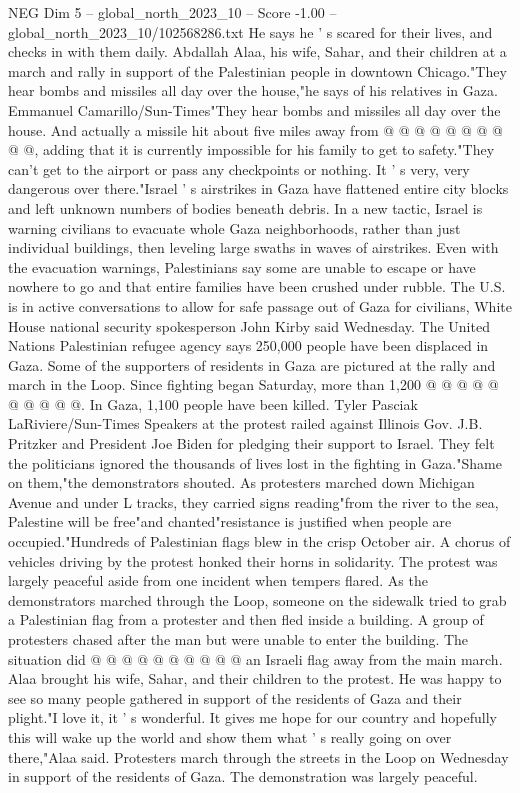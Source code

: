 \begin{textsample}{NEG Dim 5 – global\_north\_2023\_10 – Score -1.00 – global\_north\_2023\_10/102568286.txt}
He says he ' s scared for their lives, and checks in with them daily.
Abdallah Alaa, his wife, Sahar, and their children at a march and rally in support of the Palestinian people in downtown Chicago."They hear bombs and missiles all day over the house,"he says of his relatives in Gaza.
Emmanuel Camarillo/Sun-Times"They hear bombs and missiles all day over the house.
And actually a missile hit about five miles away from @ @ @ @ @ @ @ @ @ @, adding that it is currently impossible for his family to get to safety."They can't get to the airport or pass any checkpoints or nothing.
It ' s very, very dangerous over there."Israel ' s airstrikes in Gaza have flattened entire city blocks and left unknown numbers of bodies beneath debris.
In a new tactic, Israel is warning civilians to evacuate whole Gaza neighborhoods, rather than just individual buildings, then leveling large swaths in waves of airstrikes.
Even with the evacuation warnings, Palestinians say some are unable to escape or have nowhere to go and that entire families have been crushed under rubble.
The U.S. is in active conversations to allow for safe passage out of Gaza for civilians, White House national security spokesperson John Kirby said Wednesday.
The United Nations Palestinian refugee agency says 250,000 people have been displaced in Gaza.
Some of the supporters of residents in Gaza are pictured at the rally and march in the Loop.
Since fighting began Saturday, more than 1,200 @ @ @ @ @ @ @ @ @ @.
In Gaza, 1,100 people have been killed.
Tyler Pasciak LaRiviere/Sun-Times Speakers at the protest railed against Illinois Gov.
J.B.
Pritzker and President Joe Biden for pledging their support to Israel.
They felt the politicians ignored the thousands of lives lost in the fighting in Gaza."Shame on them,"the demonstrators shouted.
As protesters marched down Michigan Avenue and under L tracks, they carried signs reading"from the river to the sea, Palestine will be free"and chanted"resistance is justified when people are occupied."Hundreds of Palestinian flags blew in the crisp October air.
A chorus of vehicles driving by the protest honked their horns in solidarity.
The protest was largely peaceful aside from one incident when tempers flared.
As the demonstrators marched through the Loop, someone on the sidewalk tried to grab a Palestinian flag from a protester and then fled inside a building.
A group of protesters chased after the man but were unable to enter the building.
The situation did @ @ @ @ @ @ @ @ @ @ an Israeli flag away from the main march.
Alaa brought his wife, Sahar, and their children to the protest.
He was happy to see so many people gathered in support of the residents of Gaza and their plight."I love it, it ' s wonderful.
It gives me hope for our country and hopefully this will wake up the world and show them what ' s really going on over there,"Alaa said.
Protesters march through the streets in the Loop on Wednesday in support of the residents of Gaza.
The demonstration was largely peaceful.

\end{textsample}
